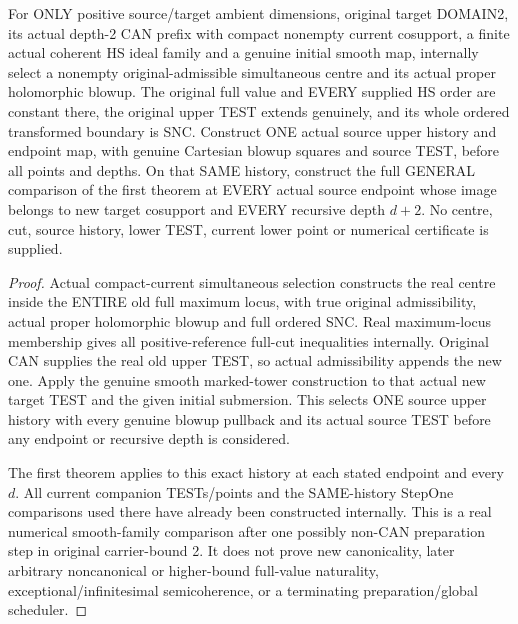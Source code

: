 \begin{theorem}
\label{hir:original-compact-domain-two-prepared-full-general-history}
\leanok
For ONLY positive source/target ambient dimensions, original target
DOMAIN2, its actual depth-2 CAN prefix with compact nonempty current
cosupport, a finite actual coherent HS ideal family and a genuine initial
smooth map, internally select a nonempty original-admissible simultaneous
centre and its actual proper holomorphic blowup. The original full value
and EVERY supplied HS order are constant there, the original upper TEST
extends genuinely, and its whole ordered transformed boundary is SNC.
Construct ONE actual source upper history and endpoint map, with genuine
Cartesian blowup squares and source TEST, before all points and depths.
On that SAME history, construct the full GENERAL comparison of the first
theorem at EVERY actual source endpoint whose image belongs to new target
cosupport and EVERY recursive depth $d+2$. No centre, cut, source history,
lower TEST, current lower point or numerical certificate is supplied.
\end{theorem}
\begin{proof}
Actual compact-current simultaneous selection constructs the real centre
inside the ENTIRE old full maximum locus, with true original admissibility,
actual proper holomorphic blowup and full ordered SNC. Real maximum-locus
membership gives all positive-reference full-cut inequalities internally.
Original CAN supplies the real old upper TEST, so actual admissibility
appends the new one. Apply the genuine smooth marked-tower construction to
that actual new target TEST and the given initial submersion. This selects
ONE source upper history with every genuine blowup pullback and its actual
source TEST before any endpoint or recursive depth is considered.

The first theorem applies to this exact history at each stated endpoint
and every $d$. All current companion TESTs/points and the SAME-history
StepOne comparisons used there have already been constructed internally.
This is a real numerical smooth-family comparison after one possibly
non-CAN preparation step in original carrier-bound 2. It does not prove
new canonicality, later arbitrary noncanonical or higher-bound full-value
naturality, exceptional/infinitesimal semicoherence, or a terminating
preparation/global scheduler.
\end{proof}
